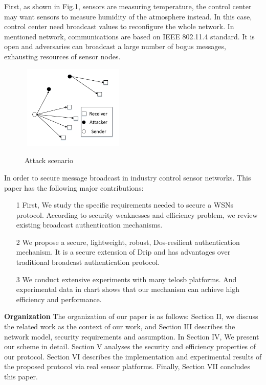 \documentclass{sig-alternate-05-2015}
\begin{document}
First, as shown in Fig.1, sensors are measuring temperature, the control center may want sensors to measure humidity of the atmosphere instead. In this case, control center need broadcast values to reconfigure the whole network. 
In mentioned network, communications are based on IEEE 802.11.4 standard. It is open and adversaries can broadcast a large number of bogus messages, exhausting resources of sensor nodes.

\begin{figure}
\centering
\includegraphics[width=5cm,height=4cm]{Attack_scenario.pdf}\\
\caption{Attack scenario}\label{} 
\end{figure}

In order to secure message broadcast in industry control sensor networks.
This paper has the following major contributions:
\begin{itemize}
\item[1] First, We study the specific requirements needed to secure a WSNs protocol. According to security weaknesses and efficiency problem, we 
review existing broadcast authentication mechanisms.
\item[2] We propose a secure, lightweight, robust, Dos-resilient authentication mechanism. It is a secure extension of Drip and has advantages over traditional broadcast authentication protocol. 
\item[3] We conduct extensive experiments with many telosb platforms. And experimental data in chart shows that our mechanism can achieve high efficiency and performance.
\end{itemize}

\textbf{Organization} The organization of our paper is as follows:  Section II, we discuss the related work as the context of our work, and Section III describes the network model, security requirements and assumption. In Section IV, We present our scheme in detail. Section V analyses the security and efficiency properties of our protocol. Section VI describes the implementation and experimental results of the proposed protocol via real sensor platforms. Finally, Section VII concludes this paper. 
\end{document}
